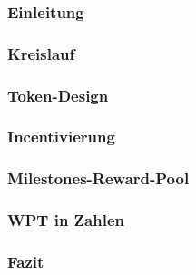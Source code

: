 \vspace{0.3cm}


\subsubsection{Einleitung}
\label{sec:wpt_einleitung}

\subsubsection{Kreislauf}
\label{sec:wpt_kreislauf}

\subsubsection{Token-Design}
\label{sec:wpt_design}

\subsubsection{Incentivierung}
\label{sec:wpt_incent}

\subsubsection{Milestones-Reward-Pool}
\label{sec:wpt_reward_pool}

\subsubsection{WPT in Zahlen}
\label{sec:wpt_zahlen}

\subsubsection{Fazit}
\label{sec:wpt_fazit}
